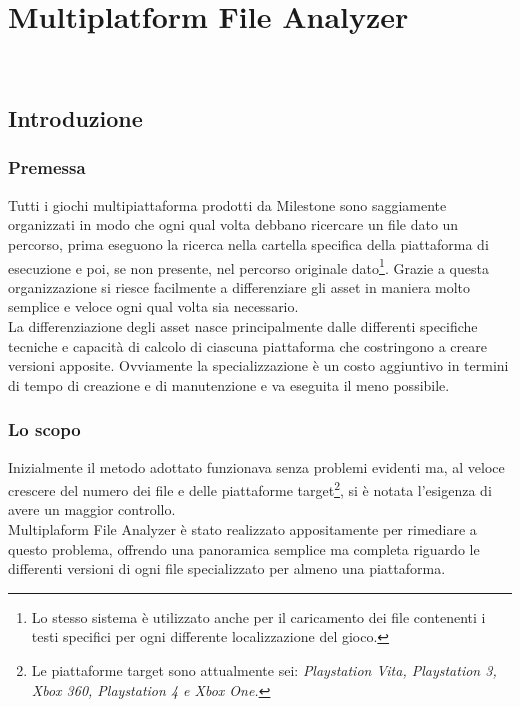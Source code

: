 
\chapter{Multiplatform File Analyzer}
\label{cap:multiplatform-file-analyzer}

\\

\section{Introduzione}

	\subsection{Premessa}
		Tutti i giochi multipiattaforma prodotti da Milestone sono saggiamente organizzati in modo che ogni qual volta debbano ricercare un file dato un percorso, prima eseguono la ricerca nella cartella specifica della piattaforma di esecuzione e poi, se non presente, nel percorso originale dato\footnote{Lo stesso sistema è utilizzato anche per il caricamento dei file contenenti i testi specifici per ogni differente localizzazione del gioco.}. Grazie a questa organizzazione si riesce facilmente a differenziare gli asset in maniera molto semplice e veloce ogni qual volta sia necessario.\\
		La differenziazione degli asset nasce principalmente dalle differenti specifiche tecniche e capacità di calcolo di ciascuna piattaforma che costringono a creare versioni apposite. Ovviamente la specializzazione è un costo aggiuntivo in termini di tempo di creazione e di manutenzione e va eseguita il meno possibile.
		
	\subsection{Lo scopo}
		Inizialmente il metodo adottato funzionava senza problemi evidenti ma, al veloce crescere del numero dei file e delle piattaforme target\footnote{Le piattaforme target sono attualmente sei: \textit{Playstation Vita, Playstation 3, Xbox 360, Playstation 4 e Xbox One.}}, si è notata l'esigenza di avere un maggior controllo.\\
		Multiplaform File Analyzer è stato realizzato appositamente per rimediare a questo problema, offrendo una panoramica semplice ma completa riguardo le differenti versioni di ogni file specializzato per almeno una piattaforma.

